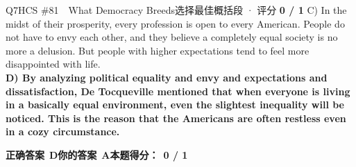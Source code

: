 \documentclass[11pt]{article}
\begin{document}
\begin{qblock}{Q7\quad HCS \#81\ \ What Democracy Breeds}{选择最佳概括段 · 评分 \textcolor{cAccent}{\bfseries 0 / 1}}
{C) In the midst of their prosperity, every profession is open to every American. People do not have to envy each other, and they believe a completely equal society is no more a delusion. But people with higher expectations tend to feel more disappointed with life.\\
{\color{cFix}\textbf{D) By analyzing political equality and envy and expectations and dissatisfaction, De Tocqueville mentioned that when everyone is living in a basically equal environment, even the slightest inequality will be noticed. This is the reason that the Americans are often restless even in a cozy circumstance.}}}
\par\smallskip
\textbf{正确答案}\ \textcolor{cFix}{\bfseries D}\qquad\textbf{你的答案}\ {\color{cWrong}\bfseries A}\qquad\textbf{本题得分：}\ {\color{cAccent}\bfseries 0 / 1}
\end{qblock}
\end{document}
